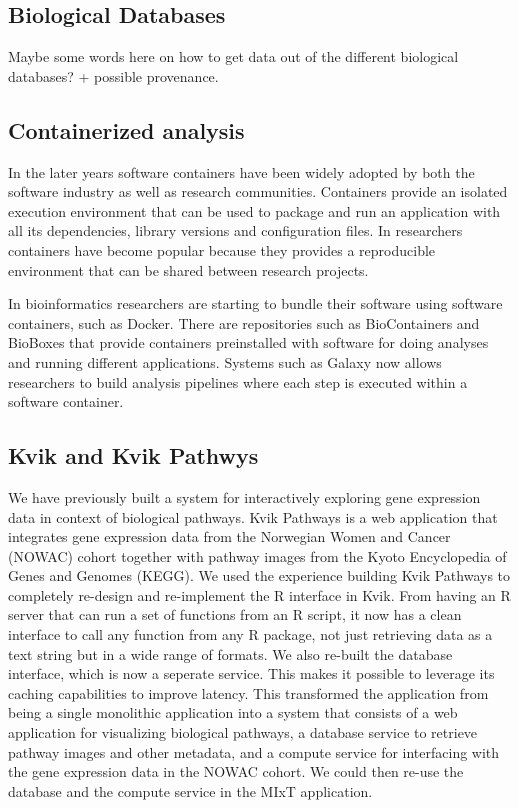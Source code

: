 
\subsection*{Biological Databases} 
Maybe some words here on how to get data out of the different biological
databases? + possible provenance. 

\subsection*{Containerized analysis} 
In the later years software containers have been widely adopted by both
the software industry as well as research communities. Containers provide an
isolated execution environment that can be used to package and run
an application with all its dependencies, library versions and configuration
files. In researchers containers have become popular because they provides a
reproducible environment that can be shared between research projects. 

In bioinformatics researchers are starting to bundle their software using
software containers, such as Docker. There are repositories such as
BioContainers\cite{dabiocontainers} and BioBoxes\cite{Belmann2015} that provide
containers preinstalled with software for doing analyses and running different
applications. Systems such as Galaxy now allows researchers to build analysis
pipelines where each step is executed within a software container. 


\subsection*{Kvik and Kvik Pathwys}
We have previously built a system for interactively exploring gene expression
data in context of  biological pathways.\cite{fjukstad2015kvik} Kvik Pathways is
a web application that integrates gene expression data from the Norwegian Women
and Cancer (NOWAC) cohort together with pathway images from the Kyoto
Encyclopedia of Genes and Genomes (KEGG). We used the experience building Kvik
Pathways to completely re-design and re-implement
the R interface in Kvik. From having an R server that can run a set of functions
from an R script, it now has a clean interface to call any function from any R
package, not just retrieving data as a text string but in a wide range of
formats. We also re-built the database interface, which is now a seperate
service. This makes it possible to leverage its caching capabilities to improve
latency. This transformed the application from being a single monolithic
application into a system that
consists of a web application for visualizing biological pathways, a database
service to retrieve pathway images and other metadata, and a compute service for
interfacing with the gene expression data in the NOWAC cohort. We could then
re-use the database and the compute service in the MIxT application. 

